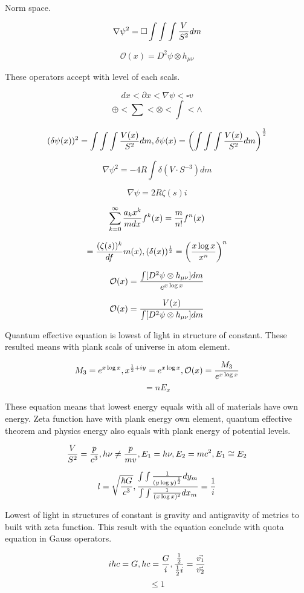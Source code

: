 \documentclass{jsarticle}
\begin{document}
Norm space.

$$ \nabla \psi^2 = \square \int \int \int {V \over S^2}dm $$

$$ \mathcal{O}(x) = D^2 \psi \otimes h_{\mu\nu} $$

These operators accept with level of each scals.

  $$ dx < \partial x < \nabla \psi < \square v $$
  $$ \oplus < \sum < \otimes < \int < \wedge $$

  $$ (\delta \psi(x))^2 = \int \int \int {V(x) \over S^2}dm, \delta \psi(x) = \left(\int \int \int {V(x) \over S^2}dm
  \right)^{1 \over 2} $$

  $$ \nabla \psi^2 = - 4 R \int \delta(V \cdot S^{-3})dm $$

  $$ \nabla \psi = 2 R \zeta(s)i $$

  $$ \sum_{k=0}^{\infty}{a_kx^k \over mdx}f^k(x) = {m \over n!}f^n(x) $$

  $$ = {(\zeta(s))^k \over df}m(x), (\delta(x))^{1 \over 2} = \left({x \log x \over x^n}\right)^n$$

  $$ \mathcal{O}(x) = {\int[D^2 \psi \otimes h_{\mu\nu}]dm \over e^{x \log x}} $$

  $$ \mathcal{O}(x) = {V(x) \over \int[D^2 \psi \otimes h_{\mu\nu}]dm} $$

  
  Quantum effective equation is lowest of light in structure of constant. These resulted means with plank
scals of universe in atom element.  

$$ M_3 = e^{x \log x}, x^{{1 \over 2} + iy} = e^{x \log x}, \mathcal{O}\mathcal(x) = {M_3 \over e^{x \log x}} $$
$$ = nE_x $$


  These equation means that lowest energy equals with all of materials have own energy. 
Zeta function have with plank energy own element, quantum effective theorem  and physics energy also
equals with plank energy of potential levels.

$$ { V \over S^2} = {p \over c^3},h\nu \neq {p \over mv}, E_1 = h\nu, E_2 = mc^2, E_1 \cong E_2 $$

$$ l = \sqrt{{\hbar G \over c^3}}, {\int \int {{1 \over (y \log y)^{1 \over 2}}}dy_m \over 
	{\int \int {1 \over (x \log x)^2}}dx_m} = {1 \over i} $$

  Lowest of light in structures of constant is gravity and antigravity of metrics to built with zeta function.
This result with the equation conclude with quota equation in Gauss operators.

$$ ihc = G, hc = {G \over i}, {{1 \over 2} \over {1 \over 2}i} = {\vec{v_1} \over \vec{v_2}} $$
$$ \le 1 $$
\end{document}
